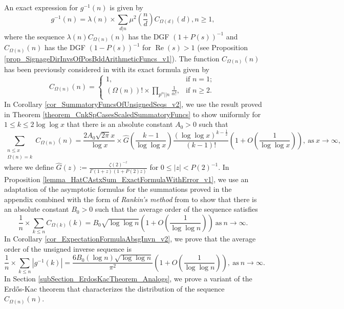 \documentclass[11pt,reqno,a4letter]{article}
\numberwithin{figure}{section}
\numberwithin{table}{section}
\newcommand{\cf}{\textit{cf.\ }}
\theoremstyle{plain}
\numberwithin{theorem}{section}
\theoremstyle{definition}
\renewcommand{\Re}{\operatorname{Re}}
\begin{document}
An exact expression for $g^{-1}(n)$ is given by 
\[
g^{-1}(n) = \lambda(n) \times \sum_{d|n} \mu^2\left(\frac{n}{d}\right) C_{\Omega(d)}(d), n \geq 1,  
\]
where the sequence $\lambda(n) C_{\Omega(n)}(n)$ has the DGF $(1 + P(s))^{-1}$ and 
$C_{\Omega(n)}(n)$ has the DGF $(1-P(s))^{-1}$ for $\Re(s) > 1$ 
(see Proposition \ref{prop_SignageDirInvsOfPosBddArithmeticFuncs_v1}). 
The function $C_{\Omega(n)}(n)$ has been previously considered in 
\cite{FROBERG-1968} with its exact formula 
given by \cite[\cf \S 3]{CLT-RANDOM-ORDERED-FACTS-2011} 
\[
C_{\Omega(n)}(n) = \begin{cases}
     1, & \text{if $n = 1$; } \\ 
     (\Omega(n))! \times \prod\limits_{p^{\alpha}||n} \frac{1}{\alpha!}, & \text{if $n \geq 2$. }
     \end{cases}
\]
In Corollary \ref{cor_SummatoryFuncsOfUnsignedSeqs_v2}, 
we use the result proved in 
Theorem \ref{theorem_CnkSpCasesScaledSummatoryFuncs} 
to show uniformly for $1 \leq k \leq 2\log\log x$ that there is an absolute 
constant $A_0 > 0$ such that 
\[
\sum_{\substack{n \leq x \\ \Omega(n)=k}} C_{\Omega(n)}(n) = 
     \frac{2A_0 \sqrt{2\pi} x}{\log x} \times 
     \widehat{G}\left(\frac{k-1}{\log\log x}\right) 
     \frac{(\log\log x)^{k-\frac{1}{2}}}{(k-1)!} \left( 
     1 + O\left(\frac{1}{\log\log x}\right)\right), 
     \mathrm{\ as\ } x \rightarrow \infty, 
\]
where we define $\widehat{G}(z) := \frac{\zeta(2)^{-z}}{\Gamma(1+z) (1+P(2)z)}$ for 
$0 \leq |z| < P(2)^{-1}$. 
In Proposition \ref{lemma_HatCAstxSum_ExactFormulaWithError_v1}, 
we use an adaptation of the asymptotic formulas for the summations proved in the appendix 
combined with the form of \emph{Rankin's method} from \cite[Thm.~7.20]{MV} to show that 
there is an absolute constant $B_0 > 0$ such that 
the average order of the sequence satisfies 
\[
\frac{1}{n} \times \sum_{k \leq n} C_{\Omega(k)}(k) = 
     B_0\sqrt{\log\log n}\left(1 + O\left(\frac{1}{\log\log n}\right)\right)
     \mathrm{\ as\ } n \rightarrow \infty. 
\]
In Corollary \ref{cor_ExpectationFormulaAbsgInvn_v2}, we prove that 
the average order of the unsigned inverse sequence is 
\[
\frac{1}{n} \times \sum_{k \leq n} |g^{-1}(k)| = 
     \frac{6B_0 (\log n) \sqrt{\log\log n}}{\pi^2} 
     \left(1 + O\left(\frac{1}{\log\log n}\right)\right), 
     \mathrm{\ as\ } n \rightarrow \infty. 
\]
In Section \ref{subSection_ErdosKacTheorem_Analogs}, 
we prove a variant of the Erd\H{o}s-Kac theorem 
that characterizes the distribution of the sequence $C_{\Omega(n)}(n)$. 
\end{document}
